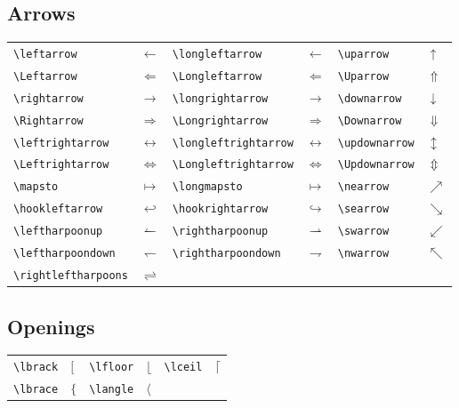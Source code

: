 \subsection{Arrows}
\begin{table}[H]
    \centering
    \begin{tabular}{lp{2cm}lp{2cm}lp{2cm}}
	\verb|\leftarrow|	& $\leftarrow$	&
	\verb|\longleftarrow|	& $\longleftarrow$	&
	\verb|\uparrow|		& $\uparrow$	    \\
	\verb|\Leftarrow|	& $\Leftarrow$	&
	\verb|\Longleftarrow|	& $\Longleftarrow$	&
	\verb|\Uparrow|		& $\Uparrow$	    \\
	\verb|\rightarrow|	& $\rightarrow$	&
	\verb|\longrightarrow|	& $\longrightarrow$	&
	\verb|\downarrow|	& $\downarrow$	    \\
	\verb|\Rightarrow|	& $\Rightarrow$	&
	\verb|\Longrightarrow|	& $\Longrightarrow$	&
	\verb|\Downarrow|	& $\Downarrow$	    \\
	\verb|\leftrightarrow|	& $\leftrightarrow$	&
	\verb|\longleftrightarrow|	& $\longleftrightarrow$	&
	\verb|\updownarrow|	& $\updownarrow$	    \\
	\verb|\Leftrightarrow|	& $\Leftrightarrow$	&
	\verb|\Longleftrightarrow|	& $\Longleftrightarrow$	&
	\verb|\Updownarrow|	& $\Updownarrow$	    \\
	\verb|\mapsto|		& $\mapsto$	&
	\verb|\longmapsto|	& $\longmapsto$	&
	\verb|\nearrow|		& $\nearrow$	    \\
	\verb|\hookleftarrow|	& $\hookleftarrow$	&
	\verb|\hookrightarrow|	& $\hookrightarrow$	&
	\verb|\searrow|		& $\searrow$	    \\
	\verb|\leftharpoonup|	& $\leftharpoonup$  &   
	\verb|\rightharpoonup|	& $\rightharpoonup$  &   
	\verb|\swarrow|		& $\swarrow$	    \\
	\verb|\leftharpoondown|	& $\leftharpoondown$  &   
	\verb|\rightharpoondown|	& $\rightharpoondown$  &   
	\verb|\nwarrow|		& $\nwarrow$	    \\
	\verb|\rightleftharpoons|	& $\rightleftharpoons$  &   
	&   &	&   \\
    \end{tabular}
\end{table}

\subsection{Openings}
\begin{table}[!htbp]
    \centering
    \begin{tabular}{lp{2cm}lp{2cm}lp{2cm}}
	\verb|\lbrack|	& $\lbrack$ &
	\verb|\lfloor|	& $\lfloor$ &
	\verb|\lceil|	& $\lceil$  \\
	\verb|\lbrace|	& $\lbrace$ &
	\verb|\langle|	& $\langle$ &
	&   \\
    \end{tabular}
\end{table}

